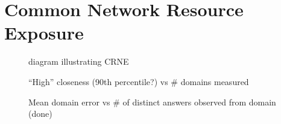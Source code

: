 \section{Common Network Resource Exposure} \label{sect:crne}

\begin{figure}
    \caption{diagram illustrating CRNE}
\end{figure}

\begin{figure}
    \caption{“High” closeness (90th percentile?) vs \# domains measured}
\end{figure}

\begin{figure}
    \caption{Mean domain error vs \# of distinct answers observed from domain (done)}
\end{figure}
